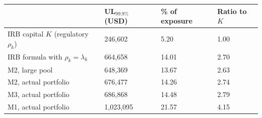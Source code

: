 \begin{tabular}{llll}
\toprule
 & UL$_{99.9\%}$ (USD) & \% of exposure & Ratio to $K$ \\
\midrule
IRB capital $K$ (regulatory $\rho_k$) & 246,602 & 5.20 & 1.00 \\
IRB formula with $\rho_k=\lambda_k$ & 664,658 & 14.01 & 2.70 \\
M2, large pool & 648,369 & 13.67 & 2.63 \\
M2, actual portfolio & 676,477 & 14.26 & 2.74 \\
M3, actual portfolio & 686,868 & 14.48 & 2.79 \\
M1, actual portfolio & 1,023,095 & 21.57 & 4.15 \\
\bottomrule
\end{tabular}
